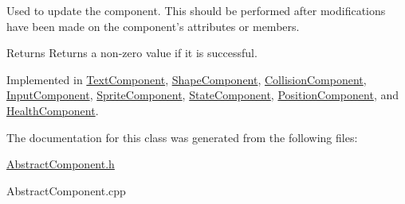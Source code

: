 Used to update the component. This should be performed after modifications have been made on the component's attributes or members.

\begin{DoxyReturn}{Returns}
Returns a non-\/zero value if it is successful. 
\end{DoxyReturn}


Implemented in \hyperlink{class_text_component_a0157702090c5ab75071448dfefb7196e}{Text\-Component}, \hyperlink{class_shape_component_ae62aa31a3d5c65c675243fdcc5f60904}{Shape\-Component}, \hyperlink{class_collision_component_a03f6ad68a39a5f7df79d5ed3e85a31eb}{Collision\-Component}, \hyperlink{class_input_component_a1577c43e70f7e7f4ac6647fb4a8563fa}{Input\-Component}, \hyperlink{class_sprite_component_a3518ccb69a3c829d5dcdc2dc024447ea}{Sprite\-Component}, \hyperlink{class_state_component_a202841453e2d2bebc43079ec2da344bb}{State\-Component}, \hyperlink{class_position_component_a1c966c7291bcf3b8c8101bb70f046f7f}{Position\-Component}, and \hyperlink{class_health_component_a1cec30820565ff476375715daf245ada}{Health\-Component}.



The documentation for this class was generated from the following files\-:\begin{DoxyCompactItemize}
\item 
\hyperlink{_abstract_component_8h}{Abstract\-Component.\-h}\item 
Abstract\-Component.\-cpp\end{DoxyCompactItemize}
